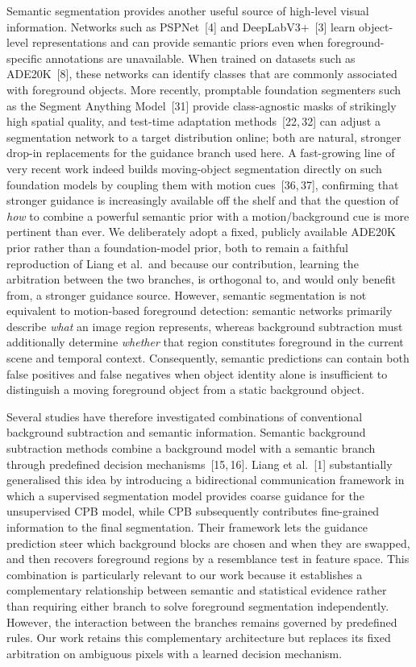 \documentclass[sn-basic]{sn-jnl}
\begin{document}
Semantic segmentation provides another useful source of high-level visual
information. Networks such as PSPNet~[4] and DeepLabV3+~[3] learn object-level
representations and can provide semantic priors even when foreground-specific
annotations are unavailable. When trained on datasets such as ADE20K~[8], these
networks can identify classes that are commonly associated with foreground objects.
More recently, promptable foundation segmenters such as the Segment Anything Model~[31]
provide class-agnostic masks of strikingly high spatial quality, and test-time
adaptation methods~[22,\,32] can adjust a segmentation network to a target distribution
online; both are natural, stronger drop-in replacements for the guidance branch used
here. A fast-growing line of very recent work indeed builds moving-object
segmentation directly on such foundation models by coupling them with motion
cues~[36,\,37], confirming that stronger guidance is increasingly available off the
shelf and that the question of \emph{how} to combine a powerful semantic prior with a
motion/background cue is more pertinent than ever. We deliberately adopt a fixed,
publicly available ADE20K prior rather than a
foundation-model prior, both to remain a faithful reproduction of Liang et al.\ and
because our contribution, learning the arbitration between the two branches, is
orthogonal to, and would only benefit from, a stronger guidance source.
However, semantic segmentation is not equivalent to motion-based foreground
detection: semantic networks primarily describe \emph{what} an image region
represents, whereas background subtraction must additionally determine
\emph{whether} that region constitutes foreground in the current scene and temporal
context. Consequently, semantic predictions can contain both false positives and
false negatives when object identity alone is insufficient to distinguish a moving
foreground object from a static background object.

Several studies have therefore investigated combinations of conventional background
subtraction and semantic information. Semantic background subtraction methods
combine a background model with a semantic branch through predefined decision
mechanisms~[15,\,16]. Liang et al.~[1] substantially generalised this idea by
introducing a bidirectional communication framework in which a supervised
segmentation model provides coarse guidance for the unsupervised CPB model, while
CPB subsequently contributes fine-grained information to the final segmentation.
Their framework lets the guidance prediction steer which background blocks are chosen
and when they are swapped, and then recovers foreground regions by a resemblance test in
feature space. This combination is particularly relevant to our
work because it establishes a complementary relationship between semantic and
statistical evidence rather than requiring either branch to solve foreground
segmentation independently. However, the interaction between the branches remains
governed by predefined rules. Our work retains this complementary architecture but
replaces its fixed arbitration on ambiguous pixels with a learned decision
mechanism.
\end{document}
